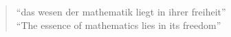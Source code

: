 \begin{frame}{}

  \pause
  \begin{quote}
    \begin{center}
    ``das wesen der mathematik liegt in ihrer freiheit'' \\[8pt]
    \pause
    ``The essence of mathematics lies in its freedom''
    \end{center}
  \end{quote}
\end{frame}
